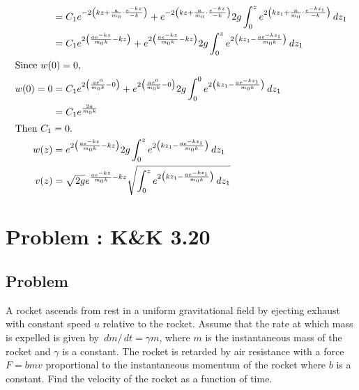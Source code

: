 \documentclass[solutions]{esg8012pset}
\renewcommand{\d}{\,d}
\begin{document}
\begin{enumerate}[a)]
\begin{align*}
    & = C_1 e^{-2\left( k z + \frac{a}{m_0} \cdot \frac{e^{-k z}}{-k}\right)} + e^{-2\left( k z + \frac{a}{m_0}\cdot \frac{e^{-k z}}{-k}\right)} 2g\int_0^z e^{2\left(k z_1 + \frac{a}{m_0}\cdot \frac{e^{-k z_1}}{-k}\right)} \d z_1 \\
    & = C_1 e^{2\left(\frac{a e^{-k z}}{m_0 k} -  k z\right)} + e^{2\left(\frac{a e^{-k z}}{m_0 k} - k z\right)} 2g\int_0^z e^{2\left(k z_1 - \frac{a e^{-k z_1}}{m_0 k}\right)} \d z_1 \\
    \intertext{Since $w(0) = 0$,}
   w(0) = 0 & = C_1 e^{2\left(\frac{a e^{0}}{m_0 k} -  0 \right)} + e^{2\left(\frac{a e^{0}}{m_0 k} - 0\right)} 2g\int_0^0 e^{2\left(k z_1 - \frac{a e^{-k z_1}}{m_0 k}\right)} \d z_1 \\
    & = C_1 e^{\frac{2a}{m_0 k}}\\
   \intertext{Then $C_1 = 0$.}
   w(z) & = e^{2\left(\frac{a e^{-k z}}{m_0 k} - k z\right)} 2g\int_0^z e^{2\left(k z_1 - \frac{a e^{-k z_1}}{m_0 k}\right)} \d z_1 \\
   v(z) & = \sqrt{2g}e^{\frac{a e^{-k z}}{m_0 k} - k z} \sqrt{\int_0^z e^{2\left(k z_1 - \frac{a e^{-k z_1}}{m_0 k}\right)} \d z_1} \\
  \end{align*}%
  \end{enumerate}
\section{Problem \thesection: K\&K 3.20}
\subsection{Problem}
  A rocket ascends from rest in a uniform gravitational field by ejecting exhaust with constant speed $u$ relative to the rocket. Assume that the rate at which mass is expelled is given by $\d m / \d t = \gamma m$, where $m$ is the instantaneous mass of the rocket and $\gamma$ is a constant. The rocket is retarded by air resistance with a force $F = b m v$ proportional to the instantaneous momentum of the rocket where $b$ is a constant. Find the velocity of the rocket as a function of time.
\end{document}
